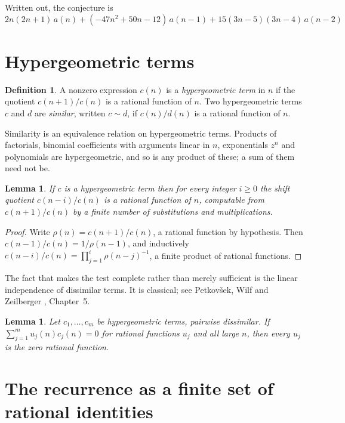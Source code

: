 \documentclass[11pt,a4paper]{article}
\theoremstyle{plain}
\newtheorem{lemma}[theorem]{Lemma}
\theoremstyle{definition}
\newtheorem{definition}[theorem]{Definition}
\begin{document}
Written out, the conjecture is
\begin{equation}\label{eq:conj}
2 n \left(2 n + 1\right)\,a(n) + (- 47 n^{2} + 50 n - 12)\,a(n-1) + 15 \left(3 n - 5\right) \left(3 n - 4\right)\,a(n-2)
\end{equation}

\section{Hypergeometric terms}

\begin{definition}
A nonzero expression $c(n)$ is a \emph{hypergeometric term} in $n$ if the quotient
$c(n+1)/c(n)$ is a rational function of $n$. Two hypergeometric terms $c$ and $d$ are
\emph{similar}, written $c\sim d$, if $c(n)/d(n)$ is a rational function of $n$.
\end{definition}

Similarity is an equivalence relation on hypergeometric terms. Products of factorials,
binomial coefficients with arguments linear in $n$, exponentials $z^{n}$ and polynomials
are hypergeometric, and so is any product of these; a sum of them need not be.

\begin{lemma}\label{lem:shift}
If $c$ is a hypergeometric term then for every integer $i\ge 0$ the shift quotient
$c(n-i)/c(n)$ is a rational function of $n$, computable from $c(n+1)/c(n)$ by a finite
number of substitutions and multiplications.
\end{lemma}

\begin{proof}
Write $\rho(n)=c(n+1)/c(n)$, a rational function by hypothesis. Then
$c(n-1)/c(n)=1/\rho(n-1)$, and inductively
$c(n-i)/c(n)=\prod_{j=1}^{i}\rho(n-j)^{-1}$, a finite product of rational functions.
\end{proof}

The fact that makes the test complete rather than merely sufficient is the linear
independence of dissimilar terms. It is classical; see Petkov\v{s}ek, Wilf and Zeilberger
\cite{AB}, Chapter~5.

\begin{lemma}\label{lem:indep}
Let $c_{1},\dots,c_{m}$ be hypergeometric terms, pairwise dissimilar. If
$\sum_{j=1}^{m}u_{j}(n)c_{j}(n)=0$ for rational functions $u_{j}$ and all large $n$, then
every $u_{j}$ is the zero rational function.
\end{lemma}

\section{The recurrence as a finite set of rational identities}
\end{document}
